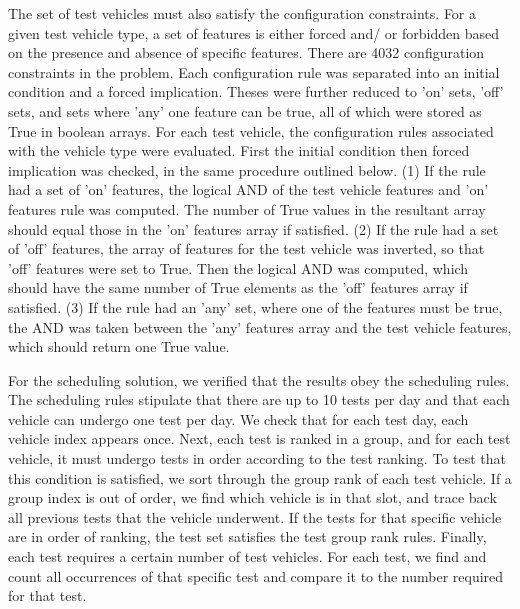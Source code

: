 \documentclass[aps,pra,twocolumn,superscriptaddress,groupedaddress]{revtex4}  %
\begin{document}
The set of test vehicles must also satisfy the configuration constraints. For a
given test vehicle type, a set of features is either forced and/ or forbidden
based on the presence and absence of specific features. There are 4032
configuration constraints in the problem. Each configuration rule was separated
into an initial condition and a forced implication. Theses were further reduced
to 'on' sets, 'off' sets, and sets where 'any' one feature can be true, all of
which were stored as True in boolean arrays. For each test vehicle, the
configuration rules associated with the vehicle type were evaluated. First the 
initial condition then forced implication was checked, in the same procedure
outlined below. (1) If the rule had a set of 'on' features, the logical AND of
the test vehicle features and 'on' features rule was computed. The number of
True values in the resultant array should equal those in the 'on' features array
if satisfied. (2) If the rule had a set of 'off' features, the array of features
for the test vehicle was inverted, so that 'off' features were set to True. Then
the logical AND was computed, which should have the same number of True elements
as the 'off' features array if satisfied. (3) If the rule had an 'any' set, where
one of the features must be true, the AND was taken between the 'any' features
array and the test vehicle features, which should return one True value.

For the scheduling solution, we verified that the results obey the scheduling
rules. The scheduling rules stipulate that there are up to 10 tests per day and
that each vehicle can undergo one test per day. We check that for each test day,
each vehicle index appears once. Next, each test is ranked in a group, and for
each test vehicle, it must undergo tests in order according to the test ranking.
To test that this condition is satisfied, we sort through the group rank of each
test vehicle. If a group index is out of order, we find which vehicle is in that
slot, and trace back all previous tests that the vehicle underwent. If the tests
for that specific vehicle are in order of ranking, the test set satisfies the test
group rank rules. Finally, each test requires a certain number of test vehicles.
For each test, we find and count all occurrences of that specific test and compare
it to the number required for that test. 
\end{document}
